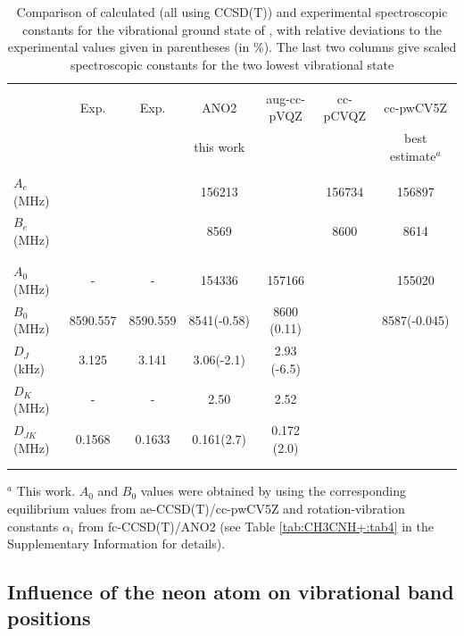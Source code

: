 \begin{table}

\caption{Comparison of calculated (all using CCSD(T)) and experimental spectroscopic constants for the vibrational ground state of \texorpdfstring{\pan}{Ne-CH3CNH+}, with relative deviations to the experimental values \cite{GAM2000} given in parentheses (in \texorpdfstring{$\%$}{}). The last two columns give scaled spectroscopic constants for the two lowest vibrational state}\label{tbl2}
    \centering
    \scriptsize
    \begin{tabular}{lcccccc}
    \\\hline \hline\\
          & Exp.  & Exp.  & ANO2 & aug-cc-pVQZ & cc-pCVQZ & cc-pwCV5Z  \\
         &  \cite{GAM2000}& \cite{AHH2006}& this work &  \cite{Cerqueira2020} &  \cite{Botschwina2000}& best estimate$^a$ \\
         \hline\\
         $A_e$ (MHz) &  &  & 156213 &  & 156734  & 156897 \\
         $B_e$ (MHz) &  &  & 8569 &  & 8600 & 8614  \\
        \\\hline\\
         $A_0$ (MHz) & - & - & 154336 & 157166& & 155020  \\
        $B_0$ (MHz) & 8590.557 & 8590.559& 8541(-0.58) & 8600 (0.11)& & 8587(-0.045)  \\
         $D_J$ (kHz)  & 3.125 & 3.141 & 3.06(-2.1)&  2.93 (-6.5) & &  \\
         $D_K$ (MHz)  & - & - &  2.50 & 2.52 & & \\
         $D_{JK}$ (MHz) &  0.1568 & 0.1633 & 0.161(2.7) & 0.172 (2.0) & &    \\
         \\\hline \hline\\
    \end{tabular}

$^a$ This work. $A_0$ and $B_0$ values were obtained by using the corresponding equilibrium values from ae-CCSD(T)/cc-pwCV5Z and rotation-vibration constants $\alpha_i$ from fc-CCSD(T)/ANO2 (see Table \ref{tab:CH3CNH+:tab4} in the Supplementary Information for details).

\end{table}
\normalsize


\subsection{Influence of the neon atom on vibrational band positions}
\label{Neon influence}

